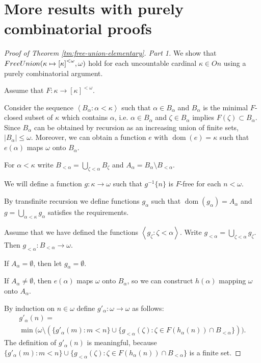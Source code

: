 \documentclass[a4paper,10pt,reqno]{amsart}
\numberwithin{equation}{section}
\theoremstyle{definition}
\theoremstyle{remark}
\newcommand{\setm}{\setminus}
\newcommand{\empt}{\emptyset}
\newcommand{\subs}{\subset}
\newcommand{\dom}{\operatorname{dom}}
\def\<{\left\langle}
\def\>{\right\rangle}
\begin{document}
    \section{More results with purely combinatorial proofs} \label{sc:more}

    


\begin{proof}[Proof of Theorem \ref{tm:free-union-elementary}.  Part 1] 
We show that   $FreeUnion({\kappa}\mapsto {[{\kappa}]}^{<\omega}, \omega)$ hold for each uncountable cardinal ${\kappa}\in On $
using a purely combinatorial argument. 

Assume  that $F:{\kappa}\to {[{\kappa}]}^{<{\omega}}$.
    
    
    
    Consider the sequence  $\<B_{\alpha}:{\alpha}<{\kappa}\>$ such that 
    ${\alpha}\in B_{\alpha}$ and $B_{\alpha}$ is the minimal $F$-closed subset of ${\kappa}$
    which contains ${\alpha}$, i.e. ${\alpha}\in B_{\alpha}$ and 
    ${\zeta}\in B_{\alpha}$ implies $F({\zeta})\subs B_{\alpha}$. 
    Since $B_{\alpha}$ can be obtained by recursion  
    as an increasing union of finite sets, $|B_{\alpha}|\le {\omega}$.
    Moreover, we can obtain  
a function $e$ with $\dom(e)={\kappa}$
    such that $e({\alpha})$ maps ${\omega}$ onto $B_{\alpha}$. 
    
    For ${\alpha}<{\kappa}$ write $B_{<{\alpha}}=\bigcup_{{\zeta}<{\alpha}}B_{{\zeta}}$
    and $A_{\alpha}=B_{\alpha}\setm B_{<{\alpha}}$.
    
    We will define a function $g:{\kappa}\to {\omega}$ such that 
    $g^{-1}\{n\}$ is $F$-free
     for each 
     $n<{\omega}$.
    
    
    By transfinite recursion we define functions $g_{\alpha}$ such that $\dom(g_{\alpha})=A_{\alpha}$
    and $g=\bigcup_{{\alpha}<{\kappa}}g_{\alpha}$ satisfies the requirements.
    
    Assume that we have defined the functions $\<g_{\zeta}:{\zeta}<{\alpha}\>$.
    Write  $g_{<{\alpha}}=\bigcup_{{\zeta}<{\alpha}}g_{\zeta}.$
    Then $g_{<{\alpha}}:B_{<\alpha}\to {\omega}$.
    
    If $A_{\alpha}=\empt$, then let $g_{\alpha}=\empt$.
    
    If $A_{\alpha}\ne \empt $, then 
    $e({\alpha})$ maps ${\omega}$ onto $B_{\alpha}$,
    so we can construct  $h({\alpha})$ mapping ${\omega}$ onto $A_{\alpha}$.
    
    
    By induction on $n\in {\omega}$
    define $g'_{\alpha}:{\omega}\to {\omega}$ as follows: 
    \begin{multline*}\tag{$\ddag$}
    g'_{\alpha}(n)=\\\min\big({\omega}\setm 
    (\{g'_{\alpha}(m):m<n\}\cup \{g_{<{\alpha}}({\zeta}):{\zeta}\in F(h_{\alpha}(n))\cap B_{<{\alpha}}\})\big).
    \end{multline*}
    The definition  of $g'_{\alpha}(n)$ is meaningful, because  
    $\{g'_{\alpha}(m):m<n\}\cup \{g_{<{\alpha}}({\zeta}):{\zeta}\in F(h_{\alpha}(n))\cap B_{<{\alpha}}\}$ 
    is a finite set. 
    

\end{proof}
\end{document}
